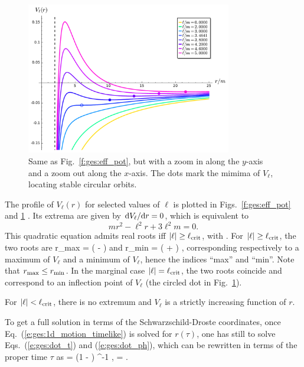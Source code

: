 \begin{figure}
\centerline{\includegraphics[width=0.8\textwidth]{ges_eff_pot_zoom.pdf}}
\caption[]{\label{f:ges:eff_pot_zoom} \footnotesize
Same as Fig.~\ref{f:ges:eff_pot}, but with a zoom in along the $y$-axis
and a zoom out along the $x$-axis. The dots mark the mimima of
$V_{\ell}$, locating stable circular orbits.}
\end{figure}

The profile  of $V_{\ell}(r)$ for selected values of $\ell$ is
plotted in Figs.~\ref{f:ges:eff_pot} and \ref{f:ges:eff_pot_zoom} .
Its extrema are given by
$\mathrm{d} V_{\ell}/\mathrm{d} r=0$, which is equivalent to
\[
    m r^2 - \ell^2 r + 3 \ell^2 m = 0 .
\]
This quadratic equation admits real roots iff $|\ell| \geq \ell_{\rm crit}$,
with
\be \label{e:ges:ell_crit}
   .
\ee
For $|\ell| \geq \ell_{\rm crit}$, the two roots are
\be
    r_{\rm max} =  \left( \ell -
     \right)
    \qquad\mbox{and}\qquad
    r_{\rm min} =  \left( \ell +
     \right) ,
\ee
corresponding respectively to a maximum of $V_{\ell}$ and a minimum
of $V_{\ell}$, hence the indices ``max'' and ``min''. Note that
$r_{\rm max} \leq r_{\rm min}$.
In the marginal case $|\ell| = \ell_{\rm crit}$, the two roots
coincide and correspond to an inflection point of $V_{\ell}$ (the circled
dot in Fig.~\ref{f:ges:eff_pot_zoom}).

For $|\ell| < \ell_{\rm crit}$, there is no extremum and
$V_{\ell}$ is a strictly increasing function of $r$.


To get a full solution in terms of the Schwarzschild-Droste coordinates,
once Eq.~(\ref{e:ges:1d_motion_timelike}) is solved for $r(\tau)$,
one has still to solve Eqs.~(\ref{e:ges:dot_t}) and (\ref{e:ges:dot_ph}),
which can be rewritten in terms of the proper time $\tau$ as
\be \label{e:ges:Dt_Dtau}
     = \veps \left(1 -  \right) ^{-1} ,
\ee
\be \label{e:ges:Dph_Dtau}
    \frac{\D\ph}{\D\tau} =   .
\ee


